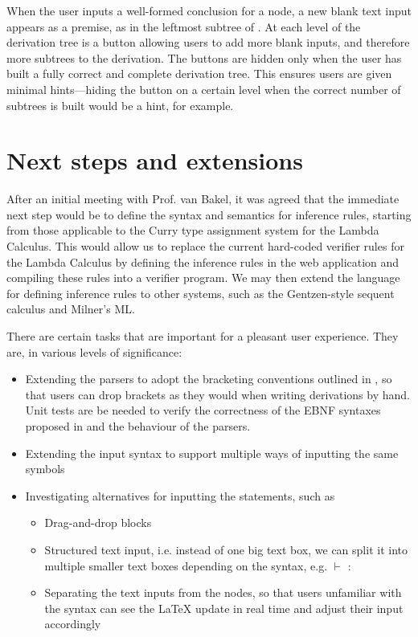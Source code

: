 When the user inputs a well-formed conclusion for a node, a new blank text input appears as a premise, as in the leftmost subtree of . At each level of the derivation tree is a button allowing users to add more blank inputs, and therefore more subtrees to the derivation. The buttons are hidden only when the user has built a fully correct and complete derivation tree. This ensures users are given minimal hints---hiding the button on a certain level when the correct number of subtrees is built would be a hint, for example.

\section{Next steps and extensions}
After an initial meeting with Prof. van Bakel, it was agreed that the immediate next step would be to define the syntax and semantics for inference rules, starting from those applicable to the Curry type assignment system for the Lambda Calculus. This would allow us to replace the current hard-coded verifier rules for the Lambda Calculus by defining the inference rules in the web application and compiling these rules into a verifier program. We may then extend the language for defining inference rules to other systems, such as the Gentzen-style sequent calculus and Milner's \textsc{ML}.

There are certain tasks that are important for a pleasant user experience. They are, in various levels of significance:
\begin{itemize}
    \item Extending the parsers to adopt the bracketing conventions outlined in , so that users can drop brackets as they would when writing derivations by hand. Unit tests are be needed to verify the correctness of the EBNF syntaxes proposed in  and the behaviour of the parsers.
    \item Extending the input syntax to support multiple ways of inputting the same symbols
    \item Investigating alternatives for inputting the statements, such as
    \begin{itemize}
        \item Drag-and-drop blocks
        \item Structured text input, i.e. instead of one big text box, we can split it into multiple smaller text boxes depending on the syntax, e.g. \fbox{\rule{0.5in}{0pt}\rule{0pt}{4pt}} $\vdash$ \fbox{\rule{0.25in}{0pt}\rule{0pt}{4pt}} $:$ \fbox{\rule{0.25in}{0pt}\rule{0pt}{4pt}}
        \item Separating the text inputs from the nodes, so that users unfamiliar with the syntax can see the \LaTeX{} update in real time and adjust their input accordingly
    \end{itemize}
\end{itemize}

